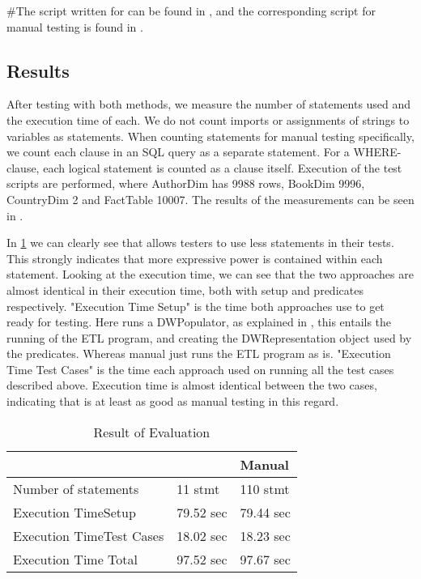 #The script written for \FW{} can be found in \Cref{}, and the corresponding script for manual testing is found in \Cref{}.

\subsection{Results}
After testing with both methods, we measure the number of statements used and the execution time of each. We do not count imports or assignments of strings to variables as statements. When counting statements for manual testing specifically, we count each clause in an SQL query as a separate statement. For a WHERE-clause, each logical statement is counted as a clause itself.  Execution of the test scripts  are performed, where AuthorDim has 9988 rows, BookDim 9996, CountryDim 2 and FactTable 10007. The results of the measurements can be seen in .

In \cref{table:result} we can clearly see that \FW{} allows testers to use less statements in their tests. This strongly indicates that more expressive power is contained within each statement. Looking at the execution time, we can see that the two approaches are almost identical in their execution time, both with setup and predicates respectively. "Execution Time Setup" is the time both approaches use to get ready for testing. Here \FW{} runs a DWPopulator, as explained in , this entails the running of the ETL program, and creating the DWRepresentation object used by the predicates. Whereas manual just runs the ETL program as is. "Execution Time Test Cases" is the time each approach used on running all the test cases described above. Execution time is almost identical between the two cases, indicating that \FW{} is at least as good as manual testing in this regard.

\begin{table}[h]
\centering
\caption{Result of Evaluation}
\label{table:result}
\begin{tabular}{|p{}|p{}|p{}|}
\hline
   																			 & \FW{}   	& Manual    \\ \hline
Number of statements 									 & 11 stmt   		  & 110  stmt  	 \\ \hline
Execution Time\newline Setup   					 & 79.52 sec   & 79.44 sec  \\ \hline
Execution Time\newline Test Cases   			 & 18.02 sec   & 18.23 sec  \\ \hline
Execution Time Total   										 & 97.52 sec   & 97.67 sec  \\ \hline

\end{tabular}
\end{table}
